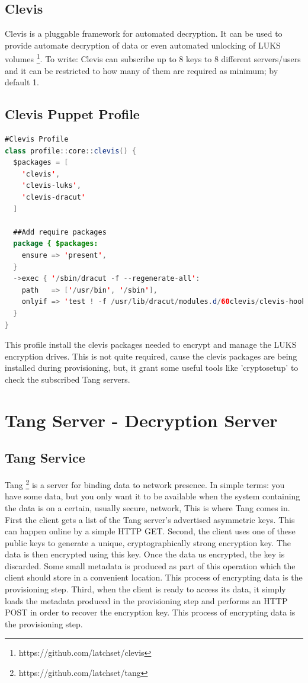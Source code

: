 \newpage
\subsection{Clevis}

Clevis is a pluggable framework for automated decryption. It can be used to provide automate decryption of data or even automated unlocking of LUKS volumes \footnote[2]{https://github.com/latchset/clevis}.
To write: Clevis can subscribe up to 8 keys to 8 different servers/users and it can be restricted to how many of them are required as minimum; by default 1.


\subsection{Clevis Puppet Profile}
\begin{lstlisting}[language=Java]
#Clevis Profile
class profile::core::clevis() {
  $packages = [
    'clevis',
    'clevis-luks',
    'clevis-dracut'
  ]

  ##Add require packages
  package { $packages:
    ensure => 'present',
  }
  ->exec { '/sbin/dracut -f --regenerate-all':
    path   => ['/usr/bin', '/sbin'],
    onlyif => 'test ! -f /usr/lib/dracut/modules.d/60clevis/clevis-hook.sh'
  }
}
\end{lstlisting}

This profile install the clevis packages needed to encrypt and manage the LUKS encryption drives. This is not quite required, cause the clevis packages are being installed during provisioning, but, it grant some useful tools like 'cryptosetup' to check the subscribed Tang servers.

\newpage
\section{Tang Server - Decryption Server}

\subsection{Tang Service}

Tang \footnote[3]{https://github.com/latchset/tang} is a server for binding data to network presence. In simple terms: you have some data, but you only want it to be available when the system containing the data is on a certain, usually secure, network, This is where Tang comes in.
First the client gets a list of the Tang server's advertised asymmetric keys. This can happen online by a simple HTTP GET. 
Second, the client uses one of these public keys to generate a unique, cryptographically strong encryption key. The data is then encrypted using this key. Once the data us encrypted, the key is discarded. Some small metadata is produced as part of this operation which the client should store in a convenient location. This process of encrypting data is the provisioning step.
Third, when the client is ready to access its data, it simply loads the metadata produced in the provisioning step and performs an HTTP POST in order to recover the encryption key. This process of encrypting data is the provisioning step.

